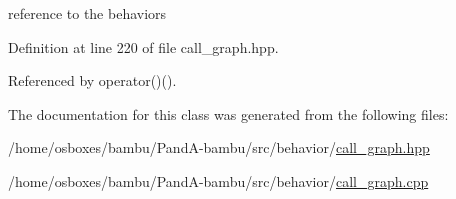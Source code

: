 reference to the behaviors 



Definition at line 220 of file call\+\_\+graph.\+hpp.



Referenced by operator()().



The documentation for this class was generated from the following files\+:\begin{DoxyCompactItemize}
\item 
/home/osboxes/bambu/\+Pand\+A-\/bambu/src/behavior/\hyperlink{call__graph_8hpp}{call\+\_\+graph.\+hpp}\item 
/home/osboxes/bambu/\+Pand\+A-\/bambu/src/behavior/\hyperlink{call__graph_8cpp}{call\+\_\+graph.\+cpp}\end{DoxyCompactItemize}
